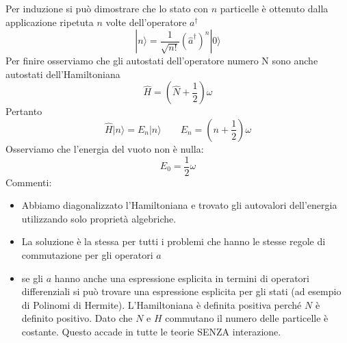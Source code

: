 Per induzione si può dimostrare che lo stato con $n$ particelle è ottenuto dalla applicazione ripetuta $n$ volte dell'operatore $a^\dagger$
$$
|n\rangle = \frac{1}{\sqrt{n!}} (\hat{a}^\dagger)^n |0\rangle
$$
Per finire osserviamo che gli autostati dell'operatore numero N sono anche autostati dell'Hamiltoniana
$$
\hat{H} = \left( \hat{N} + \frac{1}{2} \right) \omega
$$
Pertanto
$$
\hat{H} |n\rangle = E_n |n\rangle \qquad E_n = \left( n + \frac{1}{2} \right) \omega
$$
Osserviamo che l'energia del vuoto non è nulla:
$$
E_0 = \frac{1}{2} \omega
$$
Commenti:
\begin{itemize}
    \item Abbiamo diagonalizzato l'Hamiltoniana e trovato gli autovalori dell'energia utilizzando solo proprietà algebriche.
    \item La soluzione è la stessa per tutti i problemi che hanno le stesse regole di commutazione per gli operatori $a$
    \item se gli $a$ hanno anche una espressione esplicita in termini di operatori differenziali si può trovare una espressione esplicita per gli stati (ad esempio di Polinomi di Hermite). L'Hamiltoniana è definita positiva perché $N$ è definito positivo. Dato che $N$ e $H$ commutano il numero delle particelle è costante. Questo accade in tutte le teorie SENZA interazione.
\end{itemize}